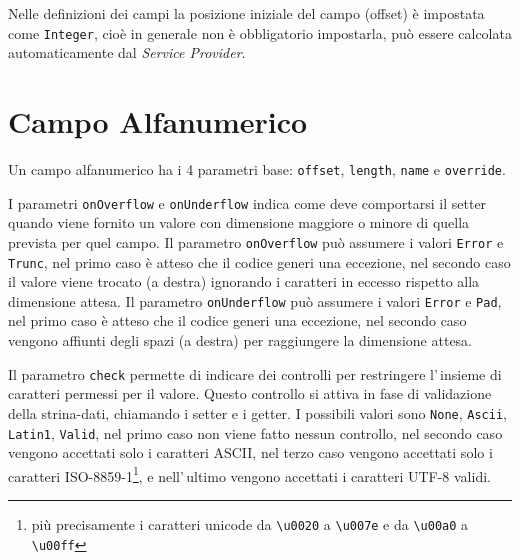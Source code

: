 \documentclass[a4paper,10pt]{report}
\begin{document}
Nelle definizioni dei campi la posizione iniziale del campo (offset) è impostata 
come \texttt{Integer}, cioè in generale non è obbligatorio impostarla, può 
essere calcolata automaticamente dal \textsl{Service Provider}.

\section{Campo Alfanumerico}
Un campo alfanumerico ha i 4 parametri base: \verb!offset!, \verb!length!,
\verb!name! e \verb!override!.

I parametri \verb!onOverflow! e \verb!onUnderflow! indica come deve comportarsi
il setter quando viene fornito un valore con dimensione maggiore o minore di
quella prevista per quel campo.
Il parametro \hypertarget{abc:ovf}{\texttt{onOverflow}} può assumere i valori 
\verb!Error! e \verb!Trunc!, nel primo caso è atteso che il codice generi una 
eccezione, nel secondo caso il valore viene trocato (a destra) ignorando i 
caratteri in eccesso rispetto alla dimensione attesa.
Il parametro \hypertarget{abc:unf}{\texttt{onUnderflow}} può assumere i valori 
\verb!Error! e \verb!Pad!, nel primo caso è atteso che il codice generi una 
eccezione, nel secondo caso vengono affiunti degli spazi (a destra) per 
raggiungere la dimensione attesa.

Il parametro \hypertarget{abc:chk}{\texttt{check}} permette di indicare dei 
controlli per restringere l'\,insieme di caratteri permessi per il valore. 
Questo controllo si attiva in fase di validazione della strina-dati, chiamando 
i setter e i getter.
I possibili valori sono \verb!None!, \verb!Ascii!, \verb!Latin1!, \verb!Valid!,
nel primo caso non viene fatto nessun controllo, nel secondo caso vengono 
accettati solo i caratteri ASCII, nel terzo caso vengono accettati solo i 
caratteri ISO-8859-1\footnote{più precisamente i caratteri unicode da 
\texttt{\textbackslash u0020} a \texttt{\textbackslash u007e} e 
da \texttt{\textbackslash u00a0} a \texttt{\textbackslash u00ff}}, e 
nell'\,ultimo vengono accettati i caratteri UTF-8 validi.
\end{document}
